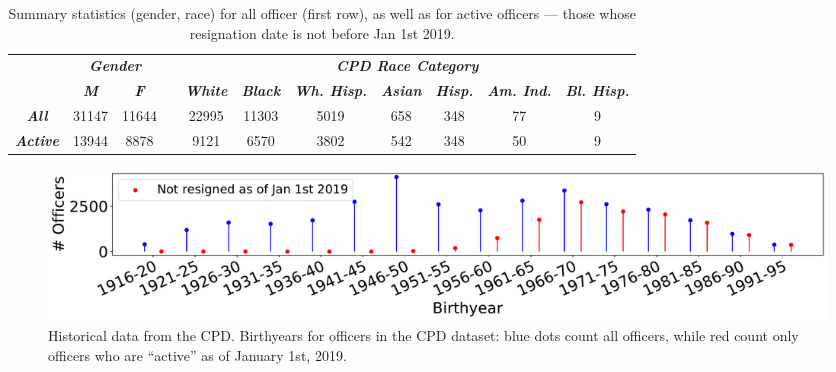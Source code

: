 \begin{table}[h]
\begin{tabular}{l|c|c|c|c|c|c|c|c|c|c|}
\cline{2-3} \cline{5-11}
                                               & \multicolumn{2}{c|}{\textit{\textbf{Gender}}} & \multicolumn{1}{l|}{} & \multicolumn{7}{c|}{\textit{\textbf{CPD Race Category}}}                                                                                                                                                            \\ \cline{2-3} \cline{5-11} 
                                               & \textit{\textbf{M}}   & \textit{\textbf{F}}   &                       & \textit{\textbf{White}} & \textit{\textbf{Black}} & \textit{\textbf{Wh. Hisp.}} & \textit{\textbf{Asian}} & \textit{\textbf{Hisp.}} & \multicolumn{1}{l|}{\textit{\textbf{Am. Ind.}}} & \textit{\textbf{Bl. Hisp.}} \\ \cline{1-3} \cline{5-11} 
\multicolumn{1}{|c|}{\textit{\textbf{All}}}    & 31147                 & 11644                 &                       & 22995                   & 11303                   & 5019                        & 658                     & 348                     & 77                                              & 9                           \\ \cline{1-3} \cline{5-11} 
\multicolumn{1}{|c|}{\textit{\textbf{Active}}} & 13944                 & 8878                  &                       & 9121                    & 6570                    & 3802                        & 542                     & 348                     & 50                                              & 9                           \\ \cline{1-3} \cline{5-11} 
\end{tabular}
\caption{Summary statistics (gender, race) for all officer (first row), as well as for active officers --- those whose resignation date is not before Jan 1st 2019.} \label{tab:stats}
\end{table}

\begin{figure}[h] 
	\includegraphics[width=\textwidth]{figs/history_by} 
	\caption{Historical data from the CPD. Birthyears for officers in the CPD dataset: blue dots count all officers, while red count only officers who are ``active'' as of January 1st, 2019.} \label{fig:history_by}
\end{figure}

